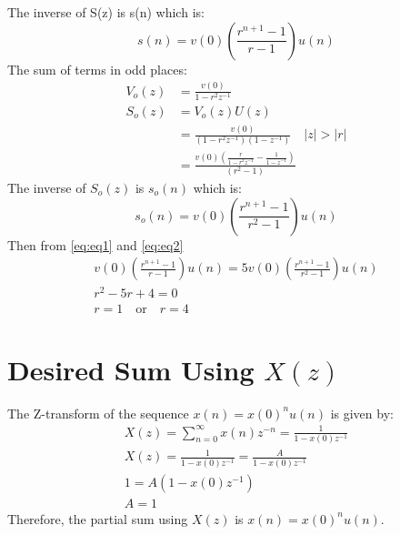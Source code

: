 \documentclass{article}
\begin{document}
The inverse of S(z) is s(n) which is:
\begin{equation}
s(n) = v(0)(\frac{r^{n+1}-1}{r-1})u(n)
\label{eq:eq1}
\end{equation}
The sum of terms in odd places:
\begin{align}
V_o(z) &= \frac{v(0)}{1-r^2z^{-1}} \\
S_o(z) &= V_o(z)U(z) \\
       &= \frac{v(0)}{(1-r^2z^{-1})(1-z^{-1})} \quad \lvert z \rvert > \lvert r \rvert \\
       &= \frac{v(0)\left(\frac{r}{1-r^2z^{-1}}-\frac{1}{1-z^{-1}}\right)}{(r^2-1)}
\end{align}
The inverse of $S_o(z)$ is $s_o(n)$ which is:
\begin{equation}
s_o(n) = v(0)\left(\frac{r^{n+1}-1}{r^2-1}\right)u(n)
\label{eq:eq2}
\end{equation}
Then from \eqref{eq:eq1} and \eqref{eq:eq2}
\begin{align}
v(0)(\frac{r^{n+1}-1}{r-1})u(n)=5v(0)(\frac{r^{n+1}-1}{r^2-1})u(n)\\
r^2-5r+4=0\\
r=1 \quad \text{or} \quad r=4
\end{align}
\section*{Desired Sum Using $X(z)$}
The Z-transform of the sequence \( x(n) = x(0)^n u(n) \) is given by:
\begin{align}
X(z) = \sum_{n=0}^{\infty} x(n)z^{-n} = \frac{1}{1 - x(0)z^{-1}}\\
X(z) = \frac{1}{1 - x(0)z^{-1}} = \frac{A}{1 - x(0)z^{-1}}\\
1 = A(1 - x(0)z^{-1}) \\
A=1
\end{align}
Therefore, the partial sum using \(X(z)\) is \(x(n) = x(0)^n u(n)\).
\end{document}
